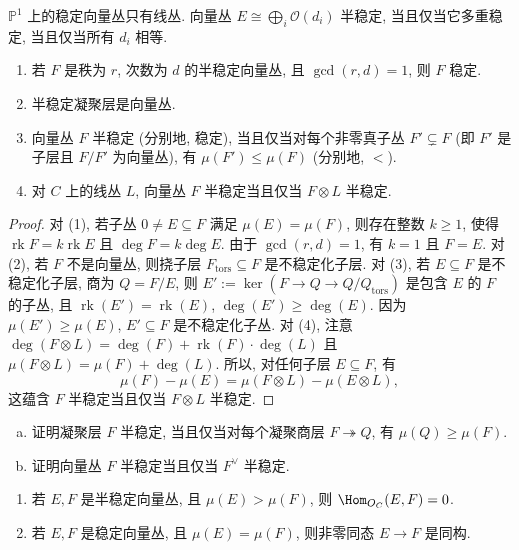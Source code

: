 \begin{example}[\texorpdfstring{$C=\mathbb P^1$}{C=P1}]\label{src:9.1.12}
$\mathbb P^1$ 上的稳定向量丛只有线丛. 向量丛 $E\cong\bigoplus_i\mathcal O(d_i)$ 半稳定, 当且仅当它多重稳定, 当且仅当所有 $d_i$ 相等.
\end{example}
\begin{lemma}\label{src:9.1.13}
\begin{enumerate}[(1)]
\item 若 $F$ 是秩为 $r$, 次数为 $d$ 的半稳定向量丛, 且 $\gcd(r,d)=1$, 则 $F$ 稳定.
\item 半稳定凝聚层是向量丛.
\item 向量丛 $F$ 半稳定 (分别地, 稳定), 当且仅当对每个非零真子丛 $F'\subsetneq F$ (即 $F'$ 是子层且 $F/F'$ 为向量丛), 有 $\mu(F')\leq\mu(F)$ (分别地, $<$).
\item 对 $C$ 上的线丛 $L$, 向量丛 $F$ 半稳定当且仅当 $F\otimes L$ 半稳定.
\end{enumerate}
\end{lemma}
\begin{proof}
对 (1), 若子丛 $0\ne E\subseteq F$ 满足 $\mu(E)=\mu(F)$, 则存在整数 $k\geq1$, 使得 $\operatorname{rk}F=k\operatorname{rk}E$ 且 $\deg F=k\deg E$. 由于 $\gcd(r,d)=1$, 有 $k=1$ 且 $F=E$. 对 (2), 若 $F$ 不是向量丛, 则挠子层 $F_{\mathrm{tors}}\subseteq F$ 是不稳定化子层. 对 (3), 若 $E\subseteq F$ 是不稳定化子层, 商为 $Q=F/E$, 则 $E':=\ker(F\to Q\to Q/Q_{\mathrm{tors}})$ 是包含 $E$ 的 $F$ 的子丛, 且 $\operatorname{rk}(E')=\operatorname{rk}(E)$, $\deg(E')\geq\deg(E)$. 因为 $\mu(E')\geq\mu(E)$, $E'\subseteq F$ 是不稳定化子丛. 对 (4), 注意 $\deg(F\otimes L)=\deg(F)+\operatorname{rk}(F)\cdot\deg(L)$ 且 $\mu(F\otimes L)=\mu(F)+\deg(L)$. 所以, 对任何子层 $E\subseteq F$, 有
\[
\mu(F)-\mu(E)=\mu(F\otimes L)-\mu(E\otimes L),
\]
这蕴含 $F$ 半稳定当且仅当 $F\otimes L$ 半稳定.
\end{proof}
\begin{exercise}[简单]\label{src:9.1.14}
\begin{enumerate}[(a)]
\item 证明凝聚层 $F$ 半稳定, 当且仅当对每个凝聚商层 $F\twoheadrightarrow Q$, 有 $\mu(Q)\geq\mu(F)$.
\item 证明向量丛 $F$ 半稳定当且仅当 $F^\vee$ 半稳定.
\end{enumerate}
\end{exercise}
\begin{lemma}[简单]\label{src:9.1.15}
\begin{enumerate}[(1)]
\item 若 $E,F$ 是半稳定向量丛, 且 $\mu(E)>\mu(F)$, 则 $\Hom_{\mathcal O_C}(E,F)=0$.
\item 若 $E,F$ 是稳定向量丛, 且 $\mu(E)=\mu(F)$, 则非零同态 $E\to F$ 是同构.
\end{enumerate}
\end{lemma}
